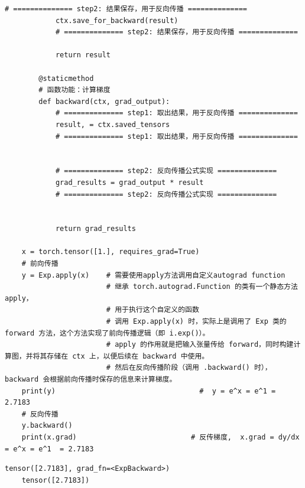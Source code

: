\begin{example}
\begin{lstlisting}[style=pythonstyle]
            # ============== step2: 结果保存，用于反向传播 ==============
            ctx.save_for_backward(result)
            # ============== step2: 结果保存，用于反向传播 ==============
    
            return result
        
        @staticmethod
        # 函数功能：计算梯度
        def backward(ctx, grad_output):
            # ============== step1: 取出结果，用于反向传播 ==============
            result, = ctx.saved_tensors
            # ============== step1: 取出结果，用于反向传播 ==============
    
    
            # ============== step2: 反向传播公式实现 ==============
            grad_results = grad_output * result
            # ============== step2: 反向传播公式实现 ==============
    
    
            return grad_results
    
    x = torch.tensor([1.], requires_grad=True)  
    # 前向传播
    y = Exp.apply(x)    # 需要使用apply方法调用自定义autograd function
                        # 继承 torch.autograd.Function 的类有一个静态方法 apply，
                        # 用于执行这个自定义的函数
                        # 调用 Exp.apply(x) 时，实际上是调用了 Exp 类的 forward 方法，这个方法实现了前向传播逻辑（即 i.exp()）。
                        # apply 的作用就是把输入张量传给 forward，同时构建计算图，并将其存储在 ctx 上，以便后续在 backward 中使用。
                        # 然后在反向传播阶段（调用 .backward() 时），backward 会根据前向传播时保存的信息来计算梯度。
    print(y)                                  #  y = e^x = e^1 = 2.7183
    # 反向传播
    y.backward()                            
    print(x.grad)                           # 反传梯度,  x.grad = dy/dx = e^x = e^1  = 2.7183
    \end{lstlisting}
    \begin{lstlisting}[style=demostyle, numbers=none]
    tensor([2.7183], grad_fn=<ExpBackward>)
    tensor([2.7183])
    \end{lstlisting}
\end{example}

